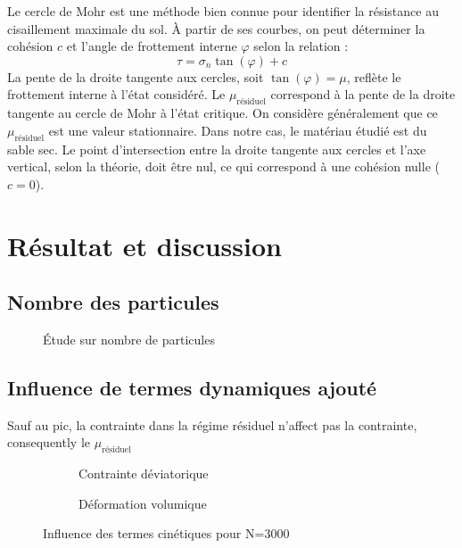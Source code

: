 \documentclass[5p,authoryear,square]{elsarticle}
\begin{document}
Le cercle de Mohr est une méthode bien connue pour identifier la résistance au cisaillement maximale du sol.  
À partir de ses courbes, on peut déterminer la cohésion $c$ et l’angle de frottement interne $\varphi$ selon la relation :
\begin{equation}
    \tau = \sigma_n \tan(\varphi) + c
    \label{eq:tangentMohr}
\end{equation}
La pente de la droite tangente aux cercles, soit $\tan(\varphi) = \mu$, reflète le frottement interne à l’état considéré.  
Le $\mu_{\text{résiduel}}$ correspond à la pente de la droite tangente au cercle de Mohr à l’état critique.  
On considère généralement que ce $\mu_{\text{résiduel}}$ est une valeur stationnaire.  
Dans notre cas, le matériau étudié est du sable sec. Le point d’intersection entre la droite tangente aux cercles et l’axe vertical, selon la théorie, doit être nul, ce qui correspond à une cohésion nulle ($c=0$).

\section{Résultat et discussion}\label{resultat}

\subsection{Nombre des particules}\label{N}

            \begin{figure}
                \centering
                \scalebox{0.5}{}
                \caption{Étude sur nombre de particules}
                \label{comparerNP}
            \end{figure}
\subsection{Influence de termes dynamiques ajouté}\label{termeDynamique}
Sauf au pic, la contrainte dans la régime résiduel n'affect pas la contrainte, consequently le $\mu_{\text{résiduel}}$

\begin{figure}[htbp]
    \centering
    \begin{subfigure}[b]{0.45\textwidth}
        \scalebox{0.5}{}
        \caption{Contrainte déviatorique}
        \label{fig:3000_kinetic_q}
    \end{subfigure}
    \hfill
    \begin{subfigure}[b]{0.45\textwidth}
        \scalebox{0.5}{}
        \caption{Déformation volumique}
        \label{fig:3000_kinetic_ev}
    \end{subfigure}
    \caption{Influence des termes cinétiques pour N=3000}
    \label{fig:3000_kinetic_comp}
\end{figure}
\end{document}
